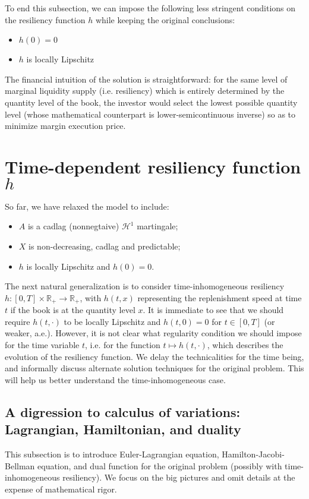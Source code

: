 \documentclass[openany,oneside]{article}
\theoremstyle{definition}
\theoremstyle{remark}
\begin{document}
To end this subsection, we can impose the following less stringent conditions on the resiliency function $h$ while keeping the original conclusions:
\begin{itemize}
\item $h(0)=0$
\item $h$ is locally Lipschitz
\end{itemize}
The financial intuition of the solution is straightforward: for the same level of marginal liquidity supply (i.e. resiliency) which is entirely determined by the quantity level of the book, the investor would select the lowest possible quantity level (whose mathematical counterpart is lower-semicontinuous inverse) so as to minimize margin execution price.


\section{Time-dependent resiliency function $h$}
So far, we have relaxed the model to include:
\begin{itemize}
\item $A$ is a cadlag (nonnegtaive) $\mathcal{H}^1$ martingale;
\item $X$ is non-decreasing, cadlag and predictable;
\item $h$ is locally Lipschitz and $h(0)=0$.
\end{itemize}

The next natural generalization is to consider time-inhomogeneous resiliency $h:[0,T]\times \mathbb{R}_+ \to \mathbb{R}_+$, with $h(t,x)$ representing the replenishment speed at time $t$ if the book is at the quantity level $x$. It is immediate to see that we should require $h(t,\cdot)$ to be locally Lipschitz and $h(t,0)=0$ for $t\in[0,T]$ (or weaker, a.e.). However, it is not clear what regularity condition we should impose for the time variable $t$, i.e. for the function $t\mapsto h(t,\cdot)$, which describes the evolution of the resiliency function. We delay the technicalities for the time being, and informally discuss alternate solution techniques for the original problem. This will help us better understand the time-inhomogeneous case.

\subsection{A digression to calculus of variations: Lagrangian, Hamiltonian, and duality}
This subsection is to introduce Euler-Lagrangian equation, Hamilton-Jacobi-Bellman equation, and dual function for the original problem (possibly with time-inhomogeneous resiliency). We focus on the big pictures and omit details at the expense of mathematical rigor.
\end{document}
